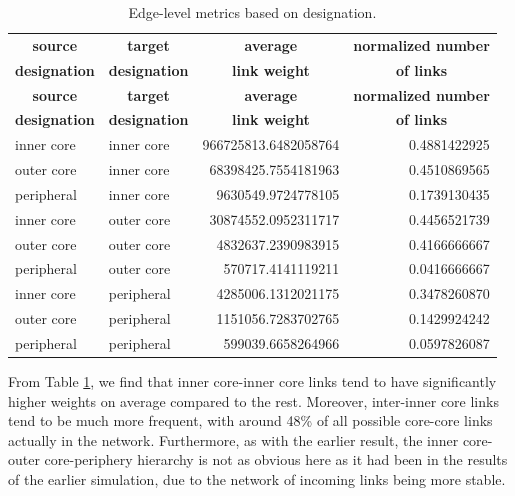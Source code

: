 \documentclass[12pt,letterpaper]{report}
\begin{document}
	\begin{longtable}{|l|l|r|r|}
		\caption{Edge-level metrics based on designation. \label{tab:tab09EdgeLevel}} \\
		\hline
		\multicolumn{1}{|c|}{\textbf{\small source}} & \multicolumn{1}{|c|}{\textbf{\small target}} & \multicolumn{1}{|c|}{\textbf{\small average}} & \textbf{\small normalized number} \\ 
		\multicolumn{1}{|c|}{\textbf{\small designation}} & \multicolumn{1}{|c|}{\textbf{\small designation}} & \multicolumn{1}{|c|}{\textbf{\small link weight}} & \multicolumn{1}{|c|}{\textbf{\small of links}} \\ 
		\hline
		\endfirsthead
		\hline
		\multicolumn{1}{|c|}{\textbf{\small source}} & \multicolumn{1}{|c|}{\textbf{\small target}} & \multicolumn{1}{|c|}{\textbf{\small average}} & \textbf{\small normalized number} \\ 
		\multicolumn{1}{|c|}{\textbf{\small designation}} & \multicolumn{1}{|c|}{\textbf{\small designation}} & \multicolumn{1}{|c|}{\textbf{\small link weight}} & \multicolumn{1}{|c|}{\textbf{\small of links}} \\ 
		\hline
		\endhead
		\hline
		\endfoot
		inner core & inner core & 966725813.6482058764 & 0.4881422925 \\
		outer core & inner core & 68398425.7554181963 & 0.4510869565 \\
		peripheral & inner core & 9630549.9724778105 & 0.1739130435 \\
		inner core & outer core & 30874552.0952311717 & 0.4456521739 \\
		outer core & outer core & 4832637.2390983915 & 0.4166666667 \\
		peripheral & outer core & 570717.4141119211 & 0.0416666667 \\
		inner core & peripheral & 4285006.1312021175 & 0.3478260870 \\
		outer core & peripheral & 1151056.7283702765 & 0.1429924242 \\
		peripheral & peripheral & 599039.6658264966 &  	0.0597826087 \\
	\end{longtable}
	
	From Table \ref{tab:tab09EdgeLevel}, we find that inner core-inner core links tend to have significantly higher weights on average compared to the rest. Moreover, inter-inner core links tend to be much more frequent, with around 48\% of all possible core-core links actually in the network. Furthermore, as with the earlier result, the inner core-outer core-periphery hierarchy is not as obvious here as it had been in the results of the earlier simulation, due to the network of incoming links being more stable.
	
\end{document}
